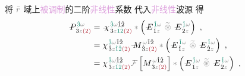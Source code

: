 将 $\mathcolor{gray}{\bar{r}}$ 域上\textcolor{Plum}{被调制}的二阶\textcolor{Plum}{非线性}系数  代入\textcolor{Plum}{非线性}波源  得
\begin{subequations} \label{eq:DP^(2)-plane_wave_basis-3_12-spectrum-C}
\begin{align}
	\Xint{\mathcolor{gray}{-}}{30}{P}^{\;\! \textcolor{PineGreen}{\hat{3}} \mathcolor{gray}{\omega} }_{\;\! \hat{3}\mathcolor{gray}{z} \textcolor{Maroon}{(2)} } &= \Xint{{}^{}_{\mathcolor{gray}{-}}}{23}{\chi}^{\;\! \textcolor{PineGreen}{\hat{3}} \mathcolor{gray}{\omega} \hat{1} \hat{2} }_{\;\! \hat{3} \mathcolor{gray}{z} \textcolor{PineGreen}{\hat{1} \hat{2}} \textcolor{Maroon}{(2)}} \mathcolor{gray}{*} \left( \Xint{\mathcolor{gray}{-}}{295}{E}^{\;\!\textcolor{PineGreen}{\hat{1}} \mathcolor{gray}{\omega}}_{\;\! \hat{1} \mathcolor{gray}{z}} ~\mathcolor{gray}{\widetilde \circledast}~ \Xint{\mathcolor{gray}{-}}{295}{E}^{\;\!\textcolor{PineGreen}{\hat{1}} \mathcolor{gray}{\omega}}_{\;\! \hat{2} \mathcolor{gray}{z}} \right) ~, \label{eq:DP^(2)-3_12-spectrum-C1} \\
	&= {\chi}^{\;\! \textcolor{PineGreen}{\hat{3}} \mathcolor{gray}{\omega} \hat{1} \hat{2} }_{\;\! \hat{3} \mathcolor{gray}{z} \textcolor{PineGreen}{\hat{1} \hat{2}} \textcolor{Maroon}{(2)}} \Xint{\mathcolor{gray}{-}}{18}{M}^{\;\! \mathcolor{gray}{\omega} \hat{1} \hat{2} }_{\;\! \hat{3} \mathcolor{gray}{z} \textcolor{Maroon}{(2)} } \mathcolor{gray}{*} \left( \Xint{\mathcolor{gray}{-}}{295}{E}^{\;\!\textcolor{PineGreen}{\hat{1}} \mathcolor{gray}{\omega}}_{\;\! \hat{1} \mathcolor{gray}{z}} ~\mathcolor{gray}{\widetilde \circledast}~ \Xint{\mathcolor{gray}{-}}{295}{E}^{\;\!\textcolor{PineGreen}{\hat{1}} \mathcolor{gray}{\omega}}_{\;\! \hat{2} \mathcolor{gray}{z}} \right) ~, \label{eq:DP^(2)-3_12-spectrum-C2} \\
	&= {\chi}^{\;\! \textcolor{PineGreen}{\hat{3}} \mathcolor{gray}{\omega} \hat{1} \hat{2} }_{\;\! \hat{3} \mathcolor{gray}{z} \textcolor{PineGreen}{\hat{1} \hat{2}} \textcolor{Maroon}{(2)}} \mathcolor{gray}{\mathcal F} \left[ M^{\;\! \mathcolor{gray}{\omega} \hat{1} \hat{2} }_{\;\! \hat{3} \mathcolor{gray}{z} \textcolor{Maroon}{(2)} } \right] \mathcolor{gray}{*} \left( \Xint{\mathcolor{gray}{-}}{295}{E}^{\;\!\textcolor{PineGreen}{\hat{1}} \mathcolor{gray}{\omega}}_{\;\! \hat{1} \mathcolor{gray}{z}} ~\mathcolor{gray}{\widetilde \circledast}~ \Xint{\mathcolor{gray}{-}}{295}{E}^{\;\!\textcolor{PineGreen}{\hat{1}} \mathcolor{gray}{\omega}}_{\;\! \hat{2} \mathcolor{gray}{z}} \right) ~, \label{eq:DP^(2)-3_12-spectrum-C3} \\

\end{align}
\end{subequations}
